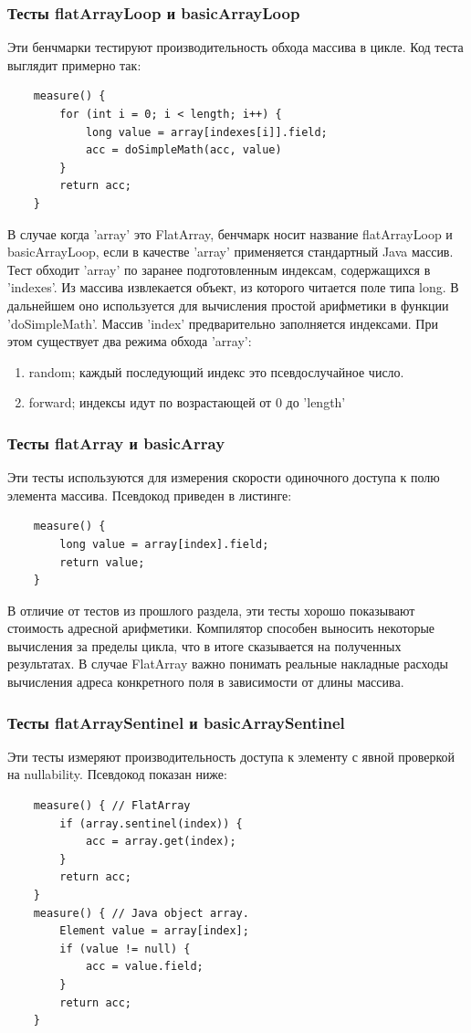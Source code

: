 \subsubsection{Тесты flatArrayLoop и basicArrayLoop}
Эти бенчмарки тестируют производительность обхода массива в цикле. Код теста выглядит примерно так:
\begin{lstlisting}
	measure() {
		for (int i = 0; i < length; i++) {
			long value = array[indexes[i]].field;
			acc = doSimpleMath(acc, value)
		}
		return acc;
	}
\end{lstlisting}
В случае когда 'array' это FlatArray, бенчмарк носит название flatArrayLoop и basicArrayLoop, если в качестве 'array' применяется стандартный Java массив.
Тест обходит 'array' по заранее подготовленным индексам, содержащихся в 'indexes'. 
Из массива извлекается объект, из которого читается поле типа long. В дальнейшем оно используется для вычисления простой арифметики в функции 'doSimpleMath'. 
Массив 'index' предварительно заполняется индексами. При этом существует два режима обхода 'array':
\begin{enumerate}
	\item random; каждый последующий индекс это псевдослучайное число.
	\item forward; индексы идут по возрастающей от 0 до 'length'
\end{enumerate}

\subsubsection{Тесты flatArray и basicArray}
Эти тесты используются для измерения скорости одиночного доступа к полю элемента массива. Псевдокод приведен в листинге:
\begin{lstlisting}
	measure() {
		long value = array[index].field;
		return value;
	}
\end{lstlisting}
В отличие от тестов из прошлого раздела, эти тесты хорошо показывают стоимость адресной арифметики. 
Компилятор способен выносить некоторые вычисления за пределы цикла, что в итоге сказывается на полученных результатах.
В случае FlatArray важно понимать реальные накладные расходы вычисления адреса конкретного поля в зависимости от длины массива.
\subsubsection{Тесты flatArraySentinel и basicArraySentinel}
Эти тесты измеряют производительность доступа к элементу с явной проверкой на nullability. Псевдокод показан ниже:
\begin{lstlisting}
	measure() { // FlatArray
		if (array.sentinel(index)) {
			acc = array.get(index);
		}
		return acc;
	}
	measure() { // Java object array.
		Element value = array[index];
		if (value != null) {
			acc = value.field;
		}
		return acc;
	}
\end{lstlisting}
